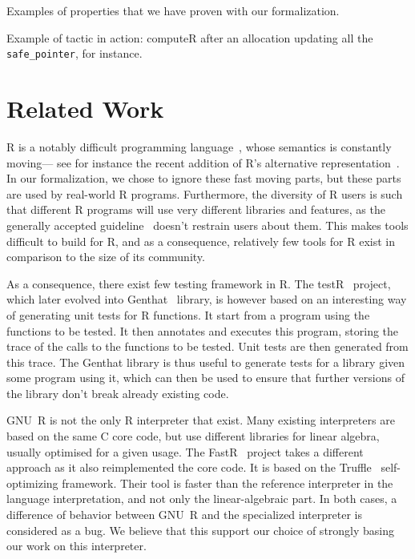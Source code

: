 \documentclass[
    sigplan,
    10pt,
    review, %
    natbib=false %
 ]{acmart}
\begin{document}
Examples of properties that we have proven with our formalization.

Example of tactic in action:
computeR after an allocation updating all the \texttt{safe_pointer}, for instance.

\section{Related Work}
\label{sec:related:work}

R is a notably difficult programming language~\parencite{RInferno},
whose semantics is constantly moving—%
see for instance the recent addition
of R's alternative representation~\parencite{altrepR}.
In our formalization, we chose to ignore these fast moving parts,
but these parts are used by real-world R programs.
Furthermore, the diversity of R users is such that different R programs
will use very different libraries and features,
as the generally accepted guideline~\parencite{RGuidelines}
doesn't restrain users about them.
This makes tools difficult to build for R,
and as a consequence, relatively few tools for R exist
in comparison to the size of its community.

As a consequence,
there exist few testing framework in R.
The testR~\parencite{maj2013testr, 2014testr} project,
which later evolved into Genthat~\parencite{genthat} library,
is however based on an interesting way of generating unit tests for R functions.
It start from a program using the functions to be tested.
It then annotates and executes this program,
storing the trace of the calls to the functions to be tested.
Unit tests are then generated from this trace.
The Genthat library is thus useful to generate tests for a library
given some program using it,
which can then be used to ensure that further versions of the library
don't break already existing code.

GNU~R is not the only R interpreter that exist.
Many existing interpreters are based on the same C core code,
but use different libraries for linear algebra,
usually optimised for a given usage.
%
The FastR~\parencite{kalibera2014fast} project takes a different approach
as it also reimplemented the core code.
It is based on the Truffle~\parencite{wuerthingertruffle}
self-optimizing framework.
Their tool is faster than the reference interpreter
in the language interpretation, and not only the linear-algebraic part.
%
In both cases, a difference of behavior between GNU~R
and the specialized interpreter is considered as a bug.
We believe that this support our choice of strongly basing
our work on this interpreter.
\end{document}
